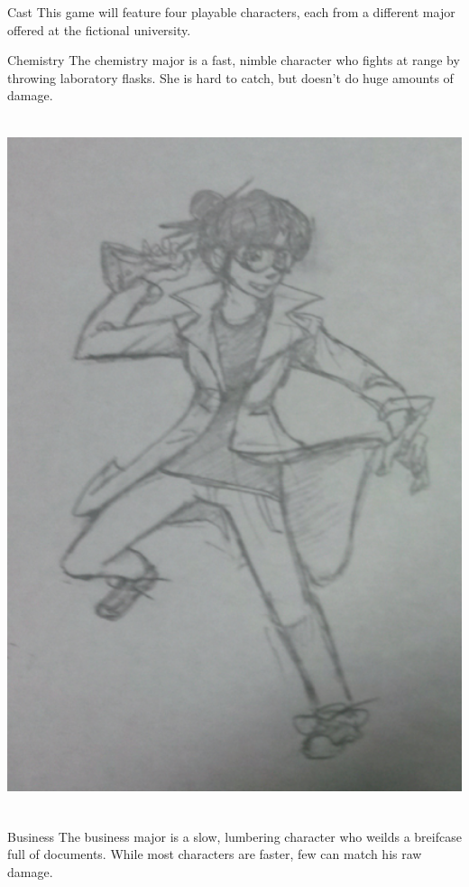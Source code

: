 \documentclass[12pt]{report}
\begin{document}
\begin{section}{Cast}
This game will feature four playable characters, each from a different major
offered at the fictional university.

\clearpage

\begin{subsection}{Chemistry}
The chemistry major is a fast, nimble character who fights at range by throwing
laboratory flasks. She is hard to catch, but doesn't do huge amounts of damage.

\includegraphics[height=8in]{chemistry.png}

\end{subsection}
\clearpage

\begin{subsection}{Business}
The business major is a slow, lumbering character who weilds a breifcase full
of documents. While most characters are faster, few can match his raw damage.


\end{subsection}
\end{section}
\end{document}
